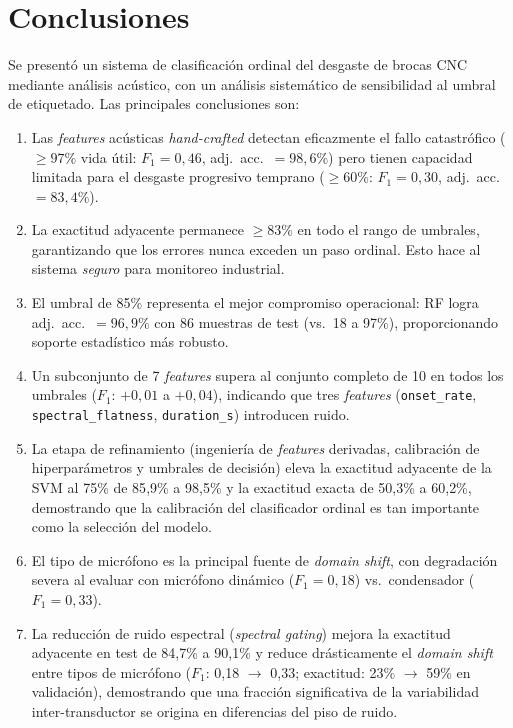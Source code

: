 \documentclass[10pt,twocolumn]{article}
\begin{document}
\section{Conclusiones}
\label{sec:conclusiones}

Se presentó un sistema de clasificación ordinal del desgaste de brocas CNC
mediante análisis acústico, con un análisis sistemático de sensibilidad al
umbral de etiquetado. Las principales conclusiones son:

\begin{enumerate}
  \item Las \textit{features} acústicas \textit{hand-crafted} detectan
    eficazmente el fallo catastrófico ($\geq 97\%$ vida útil:
    $F_1 = 0{,}46$, adj.\ acc.\ $= 98{,}6\%$) pero tienen capacidad
    limitada para el desgaste progresivo temprano ($\geq 60\%$:
    $F_1 = 0{,}30$, adj.\ acc.\ $= 83{,}4\%$).

  \item La exactitud adyacente permanece $\geq 83\%$ en todo el rango de
    umbrales, garantizando que los errores nunca exceden un paso ordinal.
    Esto hace al sistema \textit{seguro} para monitoreo industrial.

  \item El umbral de 85\% representa el mejor compromiso operacional:
    RF logra adj.\ acc.\ $= 96{,}9\%$ con 86 muestras de test (vs.\ 18
    a 97\%), proporcionando soporte estadístico más robusto.

  \item Un subconjunto de 7 \textit{features} supera al conjunto completo
    de 10 en todos los umbrales ($F_1$: $+0{,}01$ a $+0{,}04$), indicando
    que tres \textit{features} (\texttt{onset\_rate},
    \texttt{spectral\_flatness}, \texttt{duration\_s}) introducen ruido.

  \item La etapa de refinamiento (ingeniería de \textit{features}
    derivadas, calibración de hiperparámetros y umbrales de decisión)
    eleva la exactitud adyacente de la SVM al 75\% de 85{,}9\% a 98{,}5\%
    y la exactitud exacta de 50{,}3\% a 60{,}2\%, demostrando que la
    calibración del clasificador ordinal es tan importante como la
    selección del modelo.

  \item El tipo de micrófono es la principal fuente de \textit{domain
    shift}, con degradación severa al evaluar con micrófono dinámico
    ($F_1 = 0{,}18$) vs.\ condensador ($F_1 = 0{,}33$).

  \item La reducción de ruido espectral (\textit{spectral gating})
    mejora la exactitud adyacente en test de 84{,}7\% a 90{,}1\% y
    reduce drásticamente el \textit{domain shift} entre tipos de
    micrófono ($F_1$: 0{,}18 $\rightarrow$ 0{,}33; exactitud: 23\%
    $\rightarrow$ 59\% en validación), demostrando que una fracción
    significativa de la variabilidad inter-transductor se origina en
    diferencias del piso de ruido.
\end{enumerate}
\end{document}
